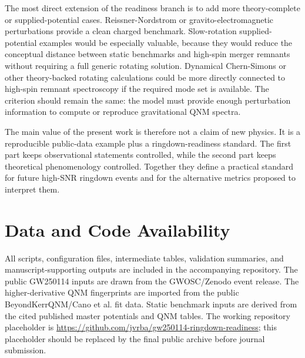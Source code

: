 \documentclass[aps,prd,10pt,twocolumn,nofootinbib,superscriptaddress]{revtex4-2}
\begin{document}
The most direct extension of the readiness branch is to add more
theory-complete or supplied-potential cases. Reissner-Nordstrom or
gravito-electromagnetic perturbations provide a clean charged benchmark.
Slow-rotation supplied-potential examples would be especially valuable,
because they would reduce the conceptual distance between static benchmarks
and high-spin merger remnants without requiring a full generic rotating
solution. Dynamical Chern-Simons or other theory-backed rotating calculations
\cite{Chu-Lam-Yun:2025:PRD:,Li-Wag-Che:2025:ARXIV:,Pie-Gua:2022:PRD:} could be
more directly connected to high-spin remnant spectroscopy if the required mode
set is available. The criterion should remain the same: the model must provide
enough perturbation information to compute or reproduce gravitational QNM
spectra.

The main value of the present work is therefore not a claim of new physics. It
is a reproducible public-data example plus a ringdown-readiness standard. The
first part keeps observational statements controlled, while the second part
keeps theoretical phenomenology controlled. Together they define a practical
standard for future high-SNR ringdown events and for the alternative metrics
proposed to interpret them.

\section*{Data and Code Availability}

All scripts, configuration files, intermediate tables, validation summaries,
and manuscript-supporting outputs are included in the accompanying repository.
The public GW250114 inputs are drawn from the GWOSC/Zenodo event release. The
higher-derivative QNM fingerprints are imported from the public
BeyondKerrQNM/Cano et al. fit data. Static benchmark inputs are derived from
the cited published master potentials and QNM tables. The working repository
placeholder is \url{https://github.com/jvrba/gw250114-ringdown-readiness}; this
placeholder should be replaced by the final public archive before journal
submission.

\clearpage


\end{document}
